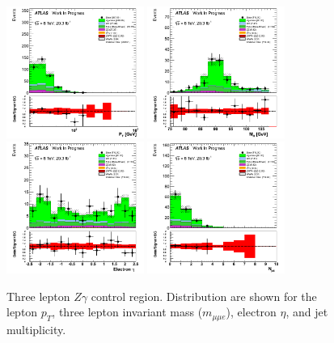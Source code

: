 \begin{figure}[htp]
\centering
\includegraphics[width=0.4\textwidth]{figures/ZG_CR/AllLeptonPt_histratio.png}
\includegraphics[width=0.4\textwidth]{figures/ZG_CR/InvariantMassThreeLep_histratio.png}
\includegraphics[width=0.4\textwidth]{figures/ZG_CR/ElectronEta_histratio.png}
\includegraphics[width=0.4\textwidth]{figures/ZG_CR/NJets_histratio.png}

\caption{Three lepton $Z\gamma$ control region. Distribution are shown for the
lepton $p_{T}$, three lepton invariant mass ($m_{\mu\mu e}$), electron $\eta$, 
and jet multiplicity.}
\label{fig:Zgamma_CR}
\end{figure}  


